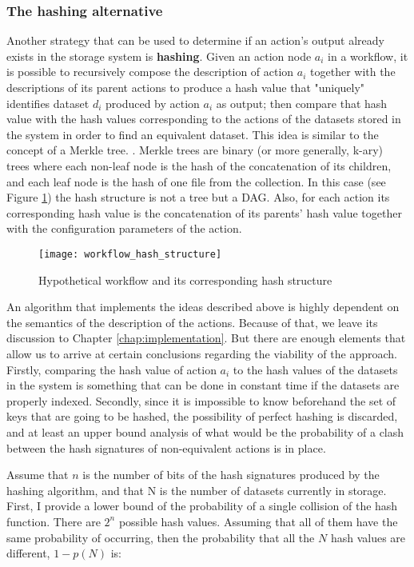 \subsubsection{The hashing alternative}
\label{sec:encryption}
Another strategy that can be used to determine if an action's output already exists in the storage system is \textbf{hashing}.  Given an action node $a_i$ in a workflow, it is possible to recursively compose the description of action $a_i$ together with the descriptions of its parent actions to produce a hash value that "uniquely" identifies dataset $d_i$ produced by action $a_i$ as output; then compare that hash value with the hash values corresponding to the actions of the datasets stored in the system in order to find an equivalent dataset. This idea is similar to the concept of a Merkle tree. \citep{merkle1980protocols}. Merkle trees are binary (or more generally, k-ary) trees where each non-leaf node is the hash of the concatenation of its children, and each leaf node is the hash of one file from the collection.  In this case (see Figure \ref{fig:hash_structure}) the hash structure is not a tree but a DAG.  Also, for each action its corresponding hash value is the concatenation of its parents' hash value together with the configuration parameters of the action.

\begin{figure}
\centering
\texttt{[image: workflow\_hash\_structure]}
\caption{Hypothetical workflow and its corresponding hash structure}
\label{fig:hash_structure}
\end{figure}

An algorithm that implements the ideas described above is highly dependent on the semantics of the description of the actions.  Because of that, we leave its discussion to Chapter \ref{chap:implementation}.  But there are enough elements that allow us to arrive at certain conclusions regarding the viability of the approach.  Firstly, comparing the hash value of action $a_i$ to the hash values of the datasets in the system is something that can be done in constant time if the datasets are properly indexed.  Secondly, since it is impossible to know beforehand the set of keys that are going to be hashed, the possibility of perfect hashing is discarded, and at least an upper bound analysis of what would be the probability of a clash between the hash signatures of non-equivalent actions is in place.  

Assume that $n$ is the number of bits of the hash signatures produced by the hashing algorithm, and that N is the number of datasets currently in storage.  First, I provide a lower bound of the probability of a single collision of the hash function. There are $2^n$ possible hash values.  Assuming that all of them have the same probability of occurring, then the probability that all the $N$ hash values are different, $1 - p(N)$ is:

